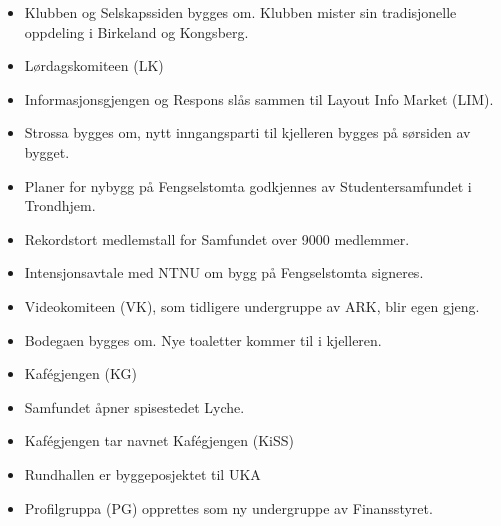 
\begin{itemize}
  \item Klubben og Selskapssiden bygges om. Klubben mister sin tradisjonelle oppdeling i Birkeland og Kongsberg.
\end{itemize}


\begin{itemize}
  \item Lørdagskomiteen (LK)
\end{itemize}


\begin{itemize}
  \item Informasjonsgjengen og Respons slås sammen til Layout Info Market (LIM).
  \item Strossa bygges om, nytt inngangsparti til kjelleren bygges på sørsiden av bygget.
\end{itemize}


\begin{itemize}
  \item Planer for nybygg på Fengselstomta godkjennes av Studentersamfundet i Trondhjem.
\end{itemize}


\begin{itemize}
  \item Rekordstort medlemstall for Samfundet over 9000 medlemmer.
  \item Intensjonsavtale med NTNU om bygg på Fengselstomta signeres.
  \item Videokomiteen (VK), som tidligere undergruppe av ARK, blir egen gjeng.
  \item Bodegaen bygges om. Nye toaletter kommer til i kjelleren.
  \item Kafégjengen (KG)
\end{itemize}


\begin{itemize}
  \item Samfundet åpner spisestedet Lyche.
  \item Kafégjengen tar navnet Kafégjengen (KiSS)
\end{itemize}


\begin{itemize}
  \item Rundhallen er byggeposjektet til UKA
  \item Profilgruppa (PG) opprettes som ny undergruppe av Finansstyret.
\end{itemize}


